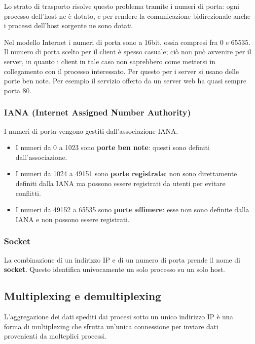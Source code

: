         Lo strato di trasporto risolve questo problema tramite i numeri di porta: ogni processo dell'host ne è dotato, e per rendere la comunicazione bidirezionale anche i processi dell'host sorgente ne sono dotati.
        
        Nel modello Internet i numeri di porta sono a 16bit, ossia compresi fra 0 e 65535. Il numero di porta scelto per il client è spesso casuale; ciò non può avvenire per il server, in quanto i client in tale caso non saprebbero come mettersi in collegamento con il processo interessato. Per questo per i server si usano delle porte ben note. Per esempio il servizio offerto da un server web ha quasi sempre porta 80.
        
        \subsubsection{IANA (Internet Assigned Number Authority)}
            I numeri di porta vengono gestiti dall'associazione IANA.
            \begin{itemize}
                \item I numeri da 0 a 1023 sono \textbf{porte ben note}: questi sono definiti dall'associazione.
                
                \item I numeri da 1024 a 49151 sono \textbf{porte registrate}: non sono direttamente definiti dalla IANA ma possono essere registrati da utenti per evitare conflitti.
                
                \item I numeri da 49152 a 65535 sono \textbf{porte effimere}: esse non sono definite dalla IANA e non possono essere registrati.
            \end{itemize}
            
        \subsubsection{Socket}
            La combinazione di un indirizzo IP e di un numero di porta prende il nome di \textbf{socket}. Questo identifica univocamente un solo processo su un solo host.
            
    \subsection{Multiplexing e demultiplexing}
        L'aggregazione dei dati spediti dai procesi sotto un unico indirizzo IP è una forma di multiplexing che sfrutta un'unica connessione per inviare dati provenienti da molteplici processi.
        
